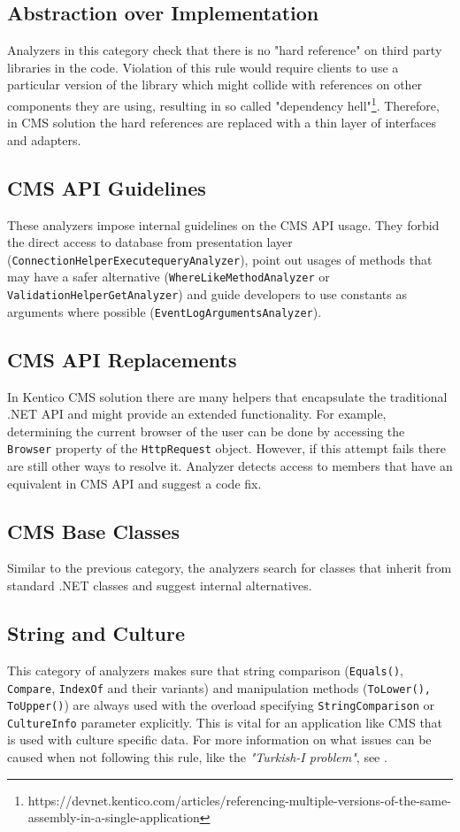 \documentclass[
  digital, %
  table,   %
  lof,     %
  lot,     %
  oneside,
]{fithesis3}
\begin{document}
\subsection{Abstraction over Implementation}
Analyzers in this category check that there is no "hard reference" on third party libraries in the code. Violation of this rule would require clients to use a particular version of the library which might collide with references on other components they are using, resulting in so called "dependency hell"\footnote{https://devnet.kentico.com/articles/referencing-multiple-versions-of-the-same-assembly-in-a-single-application}. Therefore, in CMS solution the hard references are replaced with a thin layer of interfaces and adapters.

\subsection{CMS API Guidelines}
These analyzers impose internal guidelines on the CMS API usage. They forbid the direct access to database from presentation layer (\texttt{ConnectionHelperExecutequeryAnalyzer}), point out usages of methods that may have a safer alternative (\texttt{WhereLikeMethodAnalyzer} or \texttt{ValidationHelperGetAnalyzer}) and guide developers to use constants as arguments where possible (\texttt{EventLogArgumentsAnalyzer}).

\subsection{CMS API Replacements}
In Kentico CMS solution there are many helpers that encapsulate the traditional .NET API and might provide an extended functionality. For example, determining the current browser of the user can be done by accessing the \texttt{Browser} property of the \texttt{HttpRequest} object. However, if this attempt fails there are still other ways to resolve it. Analyzer detects access to members that have an equivalent in CMS API and suggest a code fix. 

\subsection{CMS Base Classes}
Similar to the previous category, the analyzers search for classes that inherit from standard .NET classes and suggest internal alternatives.

\subsection{String and Culture}
This category of analyzers makes sure that string comparison (\texttt{Equals()}, \texttt{Compare}, \texttt{IndexOf} and their variants) and manipulation methods (\texttt{ToLower(), \texttt{ToUpper()}}) are always used with the overload specifying \texttt{StringComparison} or \texttt{CultureInfo} parameter explicitly. This is vital for an application like CMS that is used with culture specific data. For more information on what issues can be caused when not following this rule, like the \textit{"Turkish-I problem"}, see \cite{best-practices-for-using-strings-in-dot-net}. 
\end{document}

